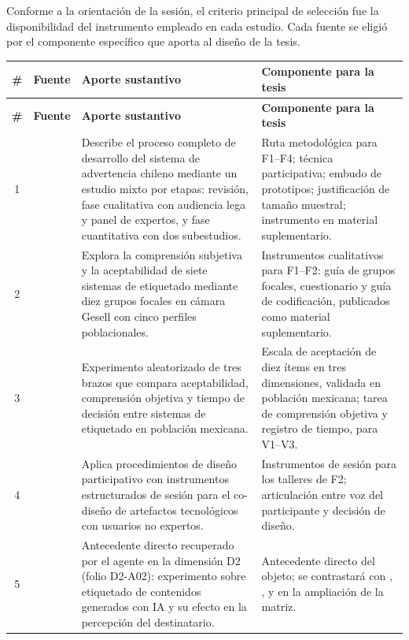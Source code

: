 \documentclass[letter,12pt]{article}
\begin{document}
Conforme a la orientación de la sesión, el criterio principal de selección fue la disponibilidad del instrumento empleado en cada estudio. Cada fuente se eligió por el componente específico que aporta al diseño de la tesis.

\begin{longtable}{|c|p{3.0cm}|p{4.2cm}|p{4.4cm}|}
\hline
\rowcolor{bgCotejo}
\textbf{\#} & \textbf{Fuente} & \textbf{Aporte sustantivo} & \textbf{Componente para la tesis} \\
\hline
\endfirsthead
\hline
\rowcolor{bgCotejo}
\textbf{\#} & \textbf{Fuente} & \textbf{Aporte sustantivo} & \textbf{Componente para la tesis} \\
\hline
\endhead

1 & \citet{reyes2019desarrollo} & Describe el proceso completo de desarrollo del sistema de advertencia chileno mediante un estudio mixto por etapas: revisión, fase cualitativa con audiencia lega y panel de expertos, y fase cuantitativa con dos subestudios. & Ruta metodológica para F1--F4; técnica participativa; embudo de prototipos; justificación de tamaño muestral; instrumento en material suplementario. \\
\hline

2 & \citet{vargasmeza2019comprension} & Explora la comprensión subjetiva y la aceptabilidad de siete sistemas de etiquetado mediante diez grupos focales en cámara Gesell con cinco perfiles poblacionales. & Instrumentos cualitativos para F1--F2: guía de grupos focales, cuestionario y guía de codificación, publicados como material suplementario. \\
\hline

3 & \citet{vargasmeza2019aceptabilidad} & Experimento aleatorizado de tres brazos que compara aceptabilidad, comprensión objetiva y tiempo de decisión entre sistemas de etiquetado en población mexicana. & Escala de aceptación de diez ítems en tres dimensiones, validada en población mexicana; tarea de comprensión objetiva y registro de tiempo, para V1--V3. \\
\hline

4 & \citet{axelsson2021} & Aplica procedimientos de diseño participativo con instrumentos estructurados de sesión para el co-diseño de artefactos tecnológicos con usuarios no expertos. & Instrumentos de sesión para los talleres de F2; articulación entre voz del participante y decisión de diseño. \\
\hline

5 & \citet{seeger2026} & Antecedente directo recuperado por el agente en la dimensión D2 (folio D2-A02): experimento sobre etiquetado de contenidos generados con IA y su efecto en la percepción del destinatario. & Antecedente directo del objeto; se contrastará con \citet{gamage2025}, \citet{wittenberg2025}, \citet{perezperez2026} y \citet{micallef2026} en la ampliación de la matriz. \\
\hline

\end{longtable}
\end{document}

